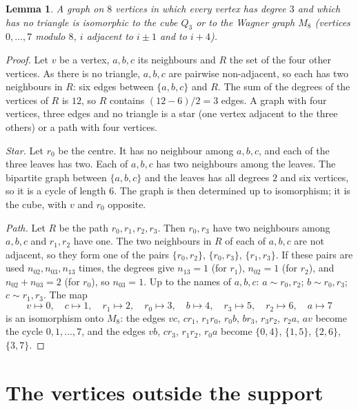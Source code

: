 \documentclass[11pt,a4paper]{article}
\newtheorem{lemma}[theorem]{Lemma}
\theoremstyle{remark}
\begin{document}
\begin{lemma}\label{lem:cubic}
A graph on $8$ vertices in which every vertex has degree $3$ and which has no triangle is isomorphic to the cube
$Q_3$ or to the Wagner graph $M_8$ (vertices $0,\dots,7$ modulo $8$, $i$ adjacent to $i\pm1$ and to $i+4$).
\end{lemma}
\begin{proof}
Let $v$ be a vertex, $a,b,c$ its neighbours and $R$ the set of the four other vertices. As there is no triangle,
$a,b,c$ are pairwise non-adjacent, so each has two neighbours in $R$: six edges between $\{a,b,c\}$ and $R$. The
sum of the degrees of the vertices of $R$ is $12$, so $R$ contains $(12-6)/2=3$ edges. A graph with four vertices,
three edges and no triangle is a star (one vertex adjacent to the three others) or a path with four vertices.

\emph{Star.} Let $r_0$ be the centre. It has no neighbour among $a,b,c$, and each of the three leaves has two.
Each of $a,b,c$ has two neighbours among the leaves. The bipartite graph between $\{a,b,c\}$ and the leaves has all
degrees $2$ and six vertices, so it is a cycle of length $6$. The graph is then determined up to isomorphism; it is
the cube, with $v$ and $r_0$ opposite.

\emph{Path.} Let $R$ be the path $r_0,r_1,r_2,r_3$. Then $r_0,r_3$ have two neighbours among $a,b,c$ and $r_1,r_2$
have one. The two neighbours in $R$ of each of $a,b,c$ are not adjacent, so they form one of the pairs
$\{r_0,r_2\}$, $\{r_0,r_3\}$, $\{r_1,r_3\}$. If these pairs are used $n_{02},n_{03},n_{13}$ times, the degrees give
$n_{13}=1$ (for $r_1$), $n_{02}=1$ (for $r_2$), and $n_{02}+n_{03}=2$ (for $r_0$), so $n_{03}=1$. Up to the names of
$a,b,c$: $a\sim r_0,r_2$; $b\sim r_0,r_3$; $c\sim r_1,r_3$. The map
\[
v\mapsto0,\quad c\mapsto1,\quad r_1\mapsto2,\quad r_0\mapsto3,\quad b\mapsto4,\quad r_3\mapsto5,\quad
r_2\mapsto6,\quad a\mapsto7
\]
is an isomorphism onto $M_8$: the edges $vc$, $cr_1$, $r_1r_0$, $r_0b$, $br_3$, $r_3r_2$, $r_2a$, $av$ become the
cycle $0,1,\dots,7$, and the edges $vb$, $cr_3$, $r_1r_2$, $r_0a$ become $\{0,4\}$, $\{1,5\}$, $\{2,6\}$, $\{3,7\}$.
\end{proof}

\section{The vertices outside the support}
\end{document}
